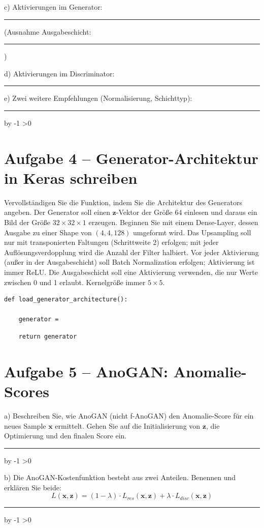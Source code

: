 \documentclass[10pt,a4paper]{article}
\newcommand{\antwortlinien}[1]{%
  \par\vspace{2pt}%
  \newcount\zeilen \zeilen=#1
  \loop
    \noindent\rule{\linewidth}{0.4pt}\par\vspace{11pt}%
    \advance\zeilen by -1
  \ifnum\zeilen>0 \repeat
}
\begin{document}
c) Aktivierungen im Generator: \rule{5cm}{0.4pt} (Ausnahme Ausgabeschicht: \rule{2.5cm}{0.4pt})

d) Aktivierungen im Discriminator: \rule{5cm}{0.4pt}

e) Zwei weitere Empfehlungen (Normalisierung, Schichttyp):
\antwortlinien{2}

\section*{Aufgabe 4 -- Generator-Architektur in Keras schreiben}

Vervollständigen Sie die Funktion, indem Sie die Architektur des Generators angeben.
Der Generator soll einen $\boldsymbol{z}$-Vektor der Größe 64 einlesen und daraus ein
Bild der Größe $32\times32\times1$ erzeugen. Beginnen Sie mit einem Dense-Layer, dessen
Ausgabe zu einer Shape von $(4, 4, 128)$ umgeformt wird. Das Upsampling soll nur mit
transponierten Faltungen (Schrittweite 2) erfolgen; mit jeder Auflösungsverdopplung wird
die Anzahl der Filter halbiert. Vor jeder Aktivierung (außer in der Ausgabeschicht) soll
Batch Normalization erfolgen; Aktivierung ist immer ReLU. Die Ausgabeschicht soll eine
Aktivierung verwenden, die nur Werte zwischen 0 und 1 erlaubt.
Kernelgröße immer $5\times5$.

\begin{lstlisting}
def load_generator_architecture():

    generator =
\end{lstlisting}

\vspace{9cm}

\begin{lstlisting}
    return generator
\end{lstlisting}

\section*{Aufgabe 5 -- AnoGAN: Anomalie-Scores}

a) Beschreiben Sie, wie AnoGAN (nicht f-AnoGAN) den Anomalie-Score für ein neues
Sample $\boldsymbol{x}$ ermittelt. Gehen Sie auf die Initialisierung von $\boldsymbol{z}$,
die Optimierung und den finalen Score ein.
\antwortlinien{5}

b) Die AnoGAN-Kostenfunktion besteht aus zwei Anteilen. Benennen und erklären Sie beide:
\[
L(\boldsymbol{x},\boldsymbol{z}) = (1-\lambda)\cdot L_{res}(\boldsymbol{x},\boldsymbol{z})
+ \lambda\cdot L_{disc}(\boldsymbol{x},\boldsymbol{z})
\]
\antwortlinien{4}
\end{document}
